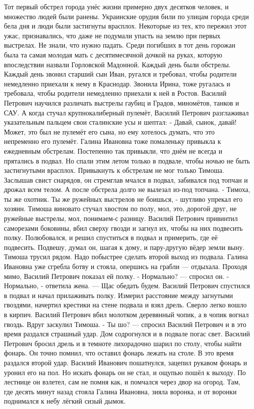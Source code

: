 Тот первый обстрел города унёс жизни примерно двух десятков человек, и множество людей были ранены. Украинские орудия били по улицам города среди бела дня и люди были застигнуты врасплох. Некоторые из тех, кто пережил этот ужас, признавались, что даже не подумали упасть на землю при первых выстрелах. Не знали, что нужно падать. Среди погибших в тот день горожан была та самая молодая мать с десятимесячной дочкой на руках, которую впоследствии назвали Горловской Мадонной.
Каждый день были обстрелы. Каждый день звонил старший сын Иван, ругался и требовал, чтобы родители немедленно приехали к нему в Краснодар. Звонила Ирина, тоже ругалась и требовала, чтобы родители немедленно приехали к ней в Ростов. Василий Петрович научился различать выстрелы гаубиц и Градов, миномётов, танков  и САУ. А когда стучал крупнокалиберный пулемёт, Василий Петрович разглаживал указательным пальцем свои сталинские усы и шептал: - Давай, сынок, давай! Может, это был не пулемёт его сына, но ему хотелось думать, что это непременно его пулемёт.
Галина Ивановна тоже помаленьку привыкла к ежедневным обстрелам. Постепенно так привыкли, что днём не всегда и прятались в подвал. Но спали этим летом только в подвале, чтобы ночью не быть застигнутыми врасплох. Привыкнуть к обстрелам не мог только Тимоша. Заслышав свист снарядов, он стремглав мчался в подвал, забивался под топчан и дрожал всем телом. А после обстрела долго не вылезал из-под топчана.
- Тимоха, ты же охотник. Ты же ружейных выстрелов не боишься, - шутливо упрекал его хозяин. Тимоша виновато стучал хвостом по полу, мол, это, дорогой друг, не ружейные выстрелы, мол, понимаем-с разницу.
Василий Петрович привинтил саморезами боковины, вбил сверху гвозди и загнул их, чтобы на них подвесить полку. Полюбовался, и решил спуститься в подвал и примерить, где её подвесить. Подвешу, думал он, шагая к дому, и пару-другую вёдер земли выну. Тимоша трусил рядом. Надо побыстрее сделать второй выход из подвала. Галина Ивановна уже сгребла ботву и стояла, опершись на грабли --- отдыхала. Проходя мимо, Василий Петрович показал ей полку.
- Нормально? --- спросил он.
- Нормально, - ответила жена. --- Щас обедать будем.
Василий Петрович спустился в подвал и начал прилаживать полку. Измерил расстояние между загнутыми гвоздями, начертил крестики на стене подвала и взял дрель. Сверло легко вошло в кирпич. Василий Петрович вбил молотком деревянный чопик, а в чопик вогнал гвоздь. Вдруг заскулил Тимоша.
- Ты шо? --- спросил Василий Петрович и в это время раздался страшный удар. Дом содрогнулся и в подвале погас свет. Василий Петрович бросил дрель и в темноте лихорадочно шарил по столу, чтобы найти фонарь. Он точно помнил, что оставил фонарь лежать на столе. В это время раздался второй удар. Василий Иванович пошатнулся, зацепил рукавом фонарь и уронил его на пол. Но искать фонарь он не стал, и ощупью пошёл к выходу. По лестнице он взлетел, сам не помня как, и помчался через двор на огород. Там, где десять минут назад стояла Галина Ивановна, зияла воронка, и от воронки поднимался к небу лёгкий сизый дымок.
